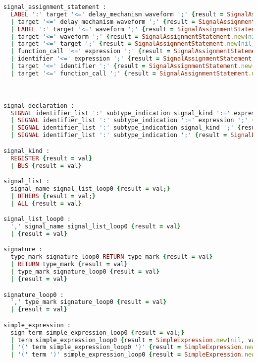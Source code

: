 \begin{lstlisting}[language=Ruby, style=rubystyle]
signal_assignment_statement :
  LABEL ':' target '<=' delay_mechanism waveform ';' {result = SignalAssignmentStatement.new(val[0],  val[2], val[4] )}
  | target '<=' delay_mechanism waveform ';' {result = SignalAssignmentStatement.new(nil, val[0], val[2])}
  | LABEL ':' target '<=' waveform ';' {result = SignalAssignmentStatement.new(val[0],val[2], val[4] )}
  | target '<=' waveform ';' {result = SignalAssignmentStatement.new(nil,val[0], val[2] );}
  | target '<=' target ';' {result = SignalAssignmentStatement.new(nil,val[0], val[2] ); ;}
  | function_call '<=' expression ';' {result = SignalAssignmentStatement.new(nil,val[0], val[2]); ;}
  | identifier '<=' expression ';' {result = SignalAssignmentStatement.new(nil,val[0], val[2]); ;}
  | target '<=' identifier ';' {result = SignalAssignmentStatement.new(nil,val[0], val[2] ); ;}
  | target '<=' function_call ';' {result = SignalAssignmentStatement.new(nil,val[0], val[2] );}



signal_declaration :
  SIGNAL identifier_list ':' subtype_indication signal_kind ':=' expression ';' {result = SignalDeclaration.new('SIGNAL', val[1],nil, val[3], val[6]);}
  | SIGNAL identifier_list ':' subtype_indication ':=' expression ';' {result = SignalDeclaration.new('SIGNAL', val[1],nil, val[3], val[5]);}
  | SIGNAL identifier_list ':' subtype_indication signal_kind ';' {result = SignalDeclaration.new('SIGNAL', val[1],nil, val[3], nil)}
  | SIGNAL identifier_list ':' subtype_indication ';' {result = SignalDeclaration.new('SIGNAL', val[1],nil, val[3], nil)}

signal_kind :
  REGISTER {result = val}
  | BUS {result = val}

signal_list :
  signal_name signal_list_loop0 {result = val;}
  | OTHERS {result = val;}
  | ALL {result = val}

signal_list_loop0 :
  ',' signal_name signal_list_loop0 {result = val}
  | {result = val}

signature :
  type_mark signature_loop0 RETURN type_mark {result = val}
  | RETURN type_mark {result = val}
  | type_mark signature_loop0 {result = val}
  | {result = val}

signature_loop0 :
  ',' type_mark signature_loop0 {result = val}
  | {result = val}

simple_expression :
  sign term simple_expression_loop0 {result = val;}
  | term simple_expression_loop0 {result = SimpleExpression.new(nil, val[0], val[1]); }
  | '(' term simple_expression_loop0 ')' {result = SimpleExpression.new(nil, val[1], val[2], true);}
  | '(' term ')' simple_expression_loop0 {result = SimpleExpression.new(nil, val[1], val[2], true);}



\end{lstlisting}
